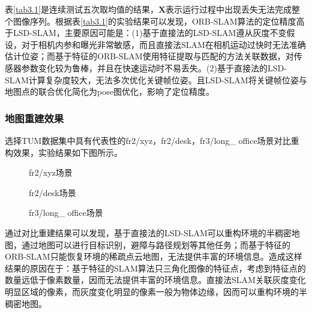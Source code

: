 表\ref{tab3.1}是连续测试五次取均值的结果，$\boldsymbol{X}$表示运行过程中出现丢失无法完成整个图像序列。根据表\ref{tab3.1}的实验结果可以发现，ORB-SLAM算法的定位精度高于LSD-SLAM，主要原因可能是：(1)基于直接法的LSD-SLAM遵从灰度不变假设，对于相机内参和曝光非常敏感，而且直接法SLAM在相机运动过快时无法准确估计位姿；而基于特征的ORB-SLAM使用特征提取与匹配的方法关联数据，对传感器参数变化较为鲁棒，并且在快速运动时不易丢失。(2)基于直接法的LSD-SLAM计算复杂度较大，无法多次优化关键帧位姿。且LSD-SLAM将关键帧位姿与地图点的联合优化简化为pose图优化，影响了定位精度。

\subsubsection{地图重建效果}
选择TUM数据集中具有代表性的fr2/xyz，fr2/desk，fr3/long\_ office场景对比重构效果，实验结果如下图所示。
\begin{figure}[h]
\centering
\caption{fr2/xyz场景}
\label{fig3.8}
\end{figure}

\begin{figure}[h]
\centering
\caption{fr2/desk场景}
\label{fig3.9}
\end{figure}
\vspace{-0pt}

\begin{figure}[h]
\centering
\caption{fr3/long\_ office场景}
\label{fig3.10}
\end{figure}
\vspace{-20pt}

通过对比重建结果可以发现，基于直接法的LSD-SLAM可以重构环境的半稠密地图，通过地图可以进行目标识别，避障与路径规划等其他任务；而基于特征的ORB-SLAM只能恢复环境的稀疏点云地图，无法提供丰富的环境信息。造成这样结果的原因在于：基于特征的SLAM算法只三角化图像的特征点，考虑到特征点的数量远低于像素数量，因而无法提供丰富的环境信息。直接法SLAM关联灰度变化明显区域的像素，而灰度变化明显的像素一般为物体边缘，因而可以重构环境的半稠密地图。

